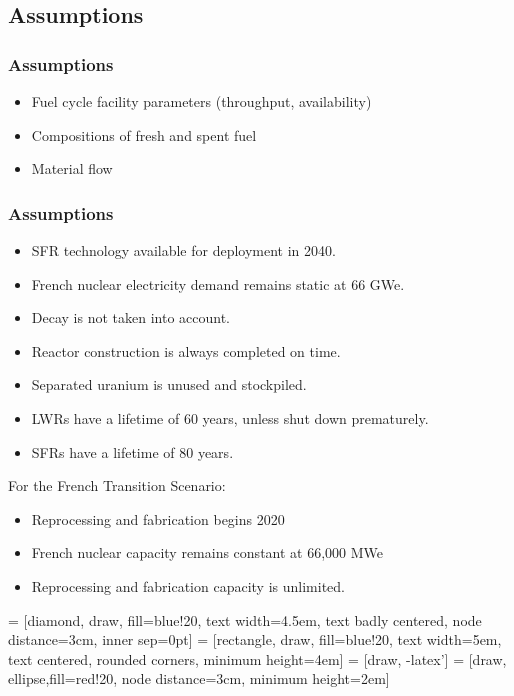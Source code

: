 \subsection{Assumptions}

\begin{frame}
	\frametitle{Assumptions}
	\begin{itemize}
		\item Fuel cycle facility parameters (throughput, availability)
		\item Compositions of fresh and spent fuel
		\item Material flow
	\end{itemize}
\end{frame}

\begin{frame}
	\frametitle{Assumptions}
	\begin{itemize}
		\item SFR technology available for deployment in 2040.
		\item French nuclear electricity demand remains static at 66 GWe.
		\item Decay is not taken into account.
		\item Reactor construction is always completed on time.
		\item Separated uranium is unused and stockpiled.
		\item LWRs have a lifetime of 60 years, unless shut down prematurely.
		\item SFRs have a lifetime of 80 years.
	\end{itemize}
	For the French Transition Scenario:
	\begin{itemize}
		\item Reprocessing and fabrication begins 2020
		\item French nuclear capacity remains constant at 66,000 MWe
		\item Reprocessing and fabrication capacity is unlimited.
	\end{itemize}
\end{frame}


 = [diamond, draw, fill=blue!20, 
text width=4.5em, text badly centered, node distance=3cm, inner sep=0pt]
 = [rectangle, draw, fill=blue!20, 
text width=5em, text centered, rounded corners, minimum height=4em]
 = [draw, -latex']
 = [draw, ellipse,fill=red!20, node distance=3cm,
minimum height=2em]

